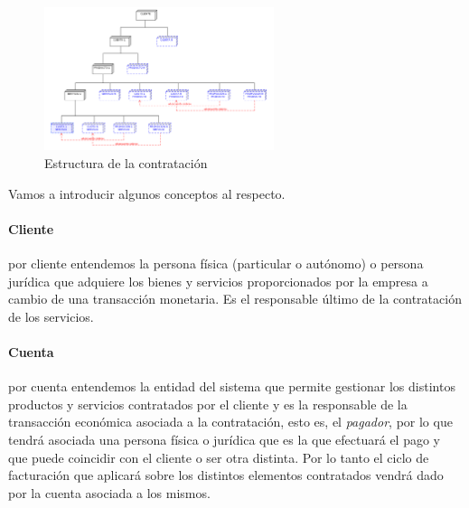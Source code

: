 \begin{figure}[H]
  \centering
  \includegraphics[width=0.60\textwidth]{imaxes/estructura-contratacion.png}
  \caption{Estructura de la contratación}
  \label{fig:estructura-contratacion}
\end{figure}


Vamos a introducir algunos conceptos al respecto.

\paragraph{Cliente} por cliente entendemos la persona física (particular o autónomo) o persona jurídica que adquiere los bienes y servicios proporcionados por la empresa a cambio de una transacción monetaria. Es el responsable último de la contratación de los servicios.

\paragraph{Cuenta} por cuenta entendemos la entidad del sistema que permite gestionar los distintos productos y servicios contratados por el cliente y es la responsable de la transacción económica asociada a la contratación, esto es, el \textit{pagador}, por lo que tendrá asociada una persona física o jurídica que es la que efectuará el pago y que puede coincidir con el cliente o ser otra distinta. Por lo tanto el ciclo de facturación que aplicará sobre los distintos elementos contratados vendrá dado por la cuenta asociada a los mismos.

